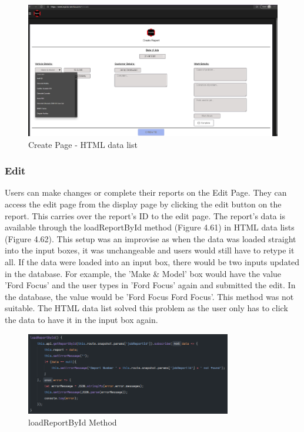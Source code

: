 \begin{figure}[H]
    \centering
    \caption{Create Page - HTML data list}
    \label{image:HTMLdatalist}
    \includegraphics[width=1.0\textwidth]{images/repota/UI/create-data.png}
\end{figure}

\subsubsection{Edit}
Users can make changes or complete their reports on the Edit Page. They can access the edit page from the display page by clicking the edit button on the report. This carries over the report's ID to the edit page. The report's data is available through the loadReportById method (Figure 4.61) in HTML data lists (Figure 4.62). This setup was an improvise as when the data was loaded straight into the input boxes, it was unchangeable and users would still have to retype it all. If the data were loaded into an input box, there would be two inputs updated in the database. For example, the 'Make \& Model' box would have the value 'Ford Focus' and the user types in 'Ford Focus' again and submitted the edit. In the database, the value would be 'Ford Focus Ford Focus'. This method was not suitable. The HTML data list solved this problem as the user only has to click the data to have it in the input box again.

\begin{figure}[H]
    \centering
    \caption{loadReportById Method}
    \label{image:loadReportById}
    \includegraphics[width=0.8\textwidth]{images/repota/report_pages/load_report.png}
\end{figure}

